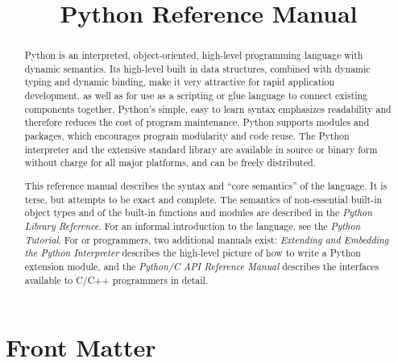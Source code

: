 \documentclass{manual}
\title{Python Reference Manual}
\begin{document}
\maketitle

\ifhtml
\chapter*{Front Matter\label{front}}
\fi



\begin{abstract}

\noindent
Python is an interpreted, object-oriented, high-level programming
language with dynamic semantics.  Its high-level built in data
structures, combined with dynamic typing and dynamic binding, make it
very attractive for rapid application development, as well as for use
as a scripting or glue language to connect existing components
together.  Python's simple, easy to learn syntax emphasizes
readability and therefore reduces the cost of program
maintenance.  Python supports modules and packages, which encourages
program modularity and code reuse.  The Python interpreter and the
extensive standard library are available in source or binary form
without charge for all major platforms, and can be freely distributed.

This reference manual describes the syntax and ``core semantics'' of
the language.  It is terse, but attempts to be exact and complete.  The
semantics of non-essential built-in object types and of the built-in
functions and modules are described in the \emph{Python Library
Reference}.  For an informal introduction to the language, see the
\emph{Python Tutorial}.  For \C{} or \Cpp{} programmers, two additional
manuals exist: \emph{Extending and Embedding the Python Interpreter}
describes the high-level picture of how to write a Python extension
module, and the \emph{Python/C API Reference Manual} describes the
interfaces available to C/C++ programmers in detail.

\end{abstract}

\tableofcontents



\end{document}
